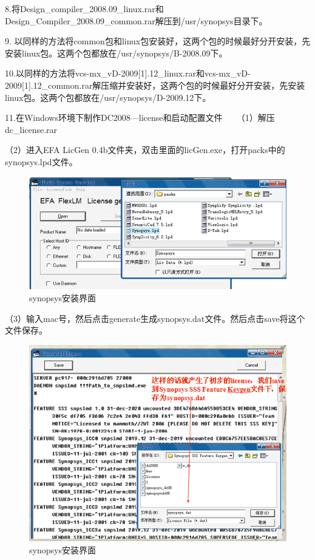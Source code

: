 8.将Design\_compiler\_2008.09\_linux.rar和Design\_Compiler\_2008.09\_common.rar解压到/usr/synopsys目录下。

9. 以同样的方法将common包和linux包安装好，这两个包的时候最好分开安装，先安装linux包。这两个包都放在/usr/synopsys/B-2008.09下。

10.以同样的方法将vcs-mx\_vD-2009[1].12\_linux.rar和vcs-mx\_vD-2009[1].12\_common.rar解压缩并安装好，这两个包的时候最好分开安装，先安装linux包。这两个包都放在/usr/synopsys/D-2009.12下。

11.在Windows环境下制作DC2008—license和启动配置文件
　
（1）解压dc\_license.rar

（2）进入EFA LicGen 0.4b文件夹，双击里面的licGen.exe，打开packs中的synopsys.lpd文件。
\begin{figure}
\centering\includegraphics[scale=0.5]{figures/synopsys3.png}
\caption{synopsys安装界面}\label{synopsys3}
\end{figure}

（3）输入mac号，然后点击generate生成synopsys.dat文件。然后点击save将这个文件保存。
\begin{figure}
\centering\includegraphics[scale=0.5]{figures/synopsys4.png}
\caption{synopsys安装界面}\label{synopsys4}
\end{figure}

